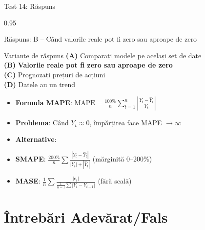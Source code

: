 \documentclass[9pt, aspectratio=169, t]{beamer}
\begin{document}
\begin{frame}{Test 14: Răspuns}
    \begin{cminipage}{0.95\textwidth}
    \begin{exampleblock}{Răspuns: B -- Când valorile reale pot fi zero sau aproape de zero}
    {\small
        \begin{block}{Variante de răspuns}
            \textcolor{MainBlue}{\textbf{(A)}} Comparați modele pe același set de date \incorrect\\[3pt]
            \textcolor{MainBlue}{\textbf{(B)}} \textbf{\textcolor{Forest}{Valorile reale pot fi zero sau aproape de zero}} \correct\\[3pt]
            \textcolor{MainBlue}{\textbf{(C)}} Prognozați prețuri de acțiuni \incorrect\\[3pt]
            \textcolor{MainBlue}{\textbf{(D)}} Datele au un trend \incorrect
        \end{block}

        \vspace{0.1cm}

        \begin{itemize}\setlength{\itemsep}{0pt}
            \item \textbf{Formula MAPE}: $\text{MAPE} = \frac{100\%}{n}\sum_{t=1}^{n}\left|\frac{Y_t - \hat{Y}_t}{Y_t}\right|$
            \item \textbf{Problema}: Când $Y_t \approx 0$, împărțirea face MAPE $\to \infty$
            \item \textbf{Alternative}:
            \item \textbf{SMAPE}: $\frac{200\%}{n}\sum\frac{|Y_t - \hat{Y}_t|}{|Y_t| + |\hat{Y}_t|}$ (mărginită 0--200\%)
            \item \textbf{MASE}: $\frac{1}{n}\sum\frac{|e_t|}{\frac{1}{n-1}\sum|Y_t - Y_{t-1}|}$ (fără scală)
        \end{itemize}
    }
    \end{exampleblock}
    \end{cminipage}
\end{frame}

\section{Întrebări Adevărat/Fals}
\end{document}
